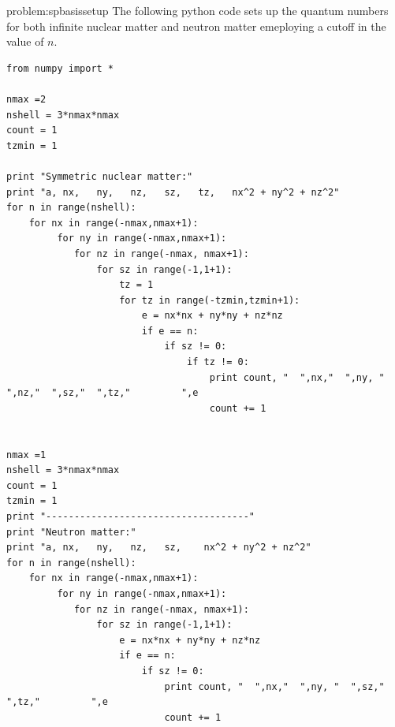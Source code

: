 \begin{sol}{problem:spbasissetup}
The following python code sets up the quantum numbers for both infinite nuclear matter and neutron 
matter emeploying a cutoff in the value of $n$.
\begin{lstlisting}
from numpy import *

nmax =2
nshell = 3*nmax*nmax
count = 1
tzmin = 1

print "Symmetric nuclear matter:"  
print "a, nx,   ny,   nz,   sz,   tz,   nx^2 + ny^2 + nz^2"
for n in range(nshell): 
    for nx in range(-nmax,nmax+1):
         for ny in range(-nmax,nmax+1):
            for nz in range(-nmax, nmax+1):  
                for sz in range(-1,1+1):
                    tz = 1
                    for tz in range(-tzmin,tzmin+1):
                        e = nx*nx + ny*ny + nz*nz
                        if e == n:
                            if sz != 0: 
                                if tz != 0: 
                                    print count, "  ",nx,"  ",ny, "  ",nz,"  ",sz,"  ",tz,"         ",e
                                    count += 1
                                    
                                    
nmax =1
nshell = 3*nmax*nmax
count = 1
tzmin = 1
print "------------------------------------"
print "Neutron matter:"                                    
print "a, nx,   ny,   nz,   sz,    nx^2 + ny^2 + nz^2"
for n in range(nshell): 
    for nx in range(-nmax,nmax+1):
         for ny in range(-nmax,nmax+1):
            for nz in range(-nmax, nmax+1):  
                for sz in range(-1,1+1):
                    e = nx*nx + ny*ny + nz*nz
                    if e == n:
                        if sz != 0: 
                            print count, "  ",nx,"  ",ny, "  ",sz,"  ",tz,"         ",e
                            count += 1                  
\end{lstlisting}                               
\end{sol}

